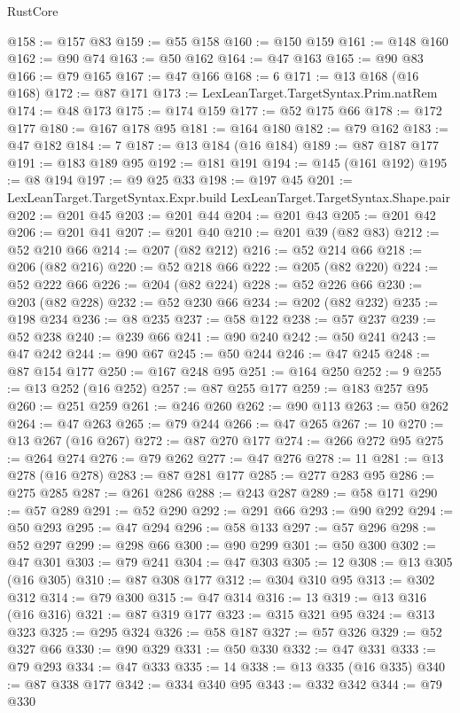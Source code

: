 \begin{lexlean}{RustCore}
\begin{coremodule}
@158 := @157 @83
@159 := @55 @158
@160 := @150 @159
@161 := @148 @160
@162 := @90 @74
@163 := @50 @162
@164 := @47 @163
@165 := @90 @83
@166 := @79 @165
@167 := @47 @166
@168 := 6
@171 := @13 @168 (@16 @168)
@172 := @87 @171
@173 := LexLeanTarget.TargetSyntax.Prim.natRem
@174 := @48 @173
@175 := @174 @159
@177 := @52 @175 @66
@178 := @172 @177
@180 := @167 @178 @95
@181 := @164 @180
@182 := @79 @162
@183 := @47 @182
@184 := 7
@187 := @13 @184 (@16 @184)
@189 := @87 @187 @177
@191 := @183 @189 @95
@192 := @181 @191
@194 := @145 (@161 @192)
@195 := @8 @194
@197 := @9 @25 @33
@198 := @197 @45
@201 := LexLeanTarget.TargetSyntax.Expr.build LexLeanTarget.TargetSyntax.Shape.pair
@202 := @201 @45
@203 := @201 @44
@204 := @201 @43
@205 := @201 @42
@206 := @201 @41
@207 := @201 @40
@210 := @201 @39 (@82 @83)
@212 := @52 @210 @66
@214 := @207 (@82 @212)
@216 := @52 @214 @66
@218 := @206 (@82 @216)
@220 := @52 @218 @66
@222 := @205 (@82 @220)
@224 := @52 @222 @66
@226 := @204 (@82 @224)
@228 := @52 @226 @66
@230 := @203 (@82 @228)
@232 := @52 @230 @66
@234 := @202 (@82 @232)
@235 := @198 @234
@236 := @8 @235
@237 := @58 @122
@238 := @57 @237
@239 := @52 @238
@240 := @239 @66
@241 := @90 @240
@242 := @50 @241
@243 := @47 @242
@244 := @90 @67
@245 := @50 @244
@246 := @47 @245
@248 := @87 @154 @177
@250 := @167 @248 @95
@251 := @164 @250
@252 := 9
@255 := @13 @252 (@16 @252)
@257 := @87 @255 @177
@259 := @183 @257 @95
@260 := @251 @259
@261 := @246 @260
@262 := @90 @113
@263 := @50 @262
@264 := @47 @263
@265 := @79 @244
@266 := @47 @265
@267 := 10
@270 := @13 @267 (@16 @267)
@272 := @87 @270 @177
@274 := @266 @272 @95
@275 := @264 @274
@276 := @79 @262
@277 := @47 @276
@278 := 11
@281 := @13 @278 (@16 @278)
@283 := @87 @281 @177
@285 := @277 @283 @95
@286 := @275 @285
@287 := @261 @286
@288 := @243 @287
@289 := @58 @171
@290 := @57 @289
@291 := @52 @290
@292 := @291 @66
@293 := @90 @292
@294 := @50 @293
@295 := @47 @294
@296 := @58 @133
@297 := @57 @296
@298 := @52 @297
@299 := @298 @66
@300 := @90 @299
@301 := @50 @300
@302 := @47 @301
@303 := @79 @241
@304 := @47 @303
@305 := 12
@308 := @13 @305 (@16 @305)
@310 := @87 @308 @177
@312 := @304 @310 @95
@313 := @302 @312
@314 := @79 @300
@315 := @47 @314
@316 := 13
@319 := @13 @316 (@16 @316)
@321 := @87 @319 @177
@323 := @315 @321 @95
@324 := @313 @323
@325 := @295 @324
@326 := @58 @187
@327 := @57 @326
@329 := @52 @327 @66
@330 := @90 @329
@331 := @50 @330
@332 := @47 @331
@333 := @79 @293
@334 := @47 @333
@335 := 14
@338 := @13 @335 (@16 @335)
@340 := @87 @338 @177
@342 := @334 @340 @95
@343 := @332 @342
@344 := @79 @330

\end{coremodule}
\end{lexlean}
